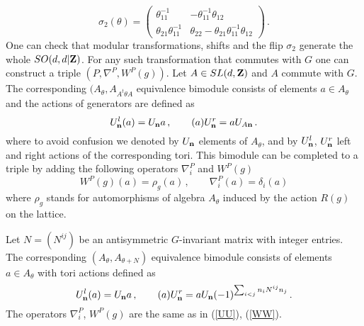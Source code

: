 \documentclass[a4paper,a4paper]{article}
\begin{document}
{\begin{equation}
\sigma_{2}(\theta ) =  \left( 
\begin{array}{cc}
\theta_{11}^{-1}&-\theta_{11}^{-1}\theta_{12}\\
\theta_{21}\theta_{11}^{-1}&\theta_{22} - \theta_{21}\theta_{11}^{-1}\theta_{12}
\end{array}
\right) \, .
\end{equation}
One can check that modular transformations, shifts and the flip $\sigma_{2}$ generate the whole $SO(d,d|{\bf Z})$.
For any such transformation that commutes with $G$ one can construct a triple $(P, \nabla^{P}, W^{P}(g))$. 
Let $A \in SL(d,{\bf Z})$ and $A$ commute with $G$. The corresponding $(A_{\theta}, A_{A^{t}\theta A}$ equivalence 
bimodule consists of elements $a\in A_{\theta}$ and the actions of generators  are 
defined as 
\begin{equation} \label{UU}
 U^{l}_{\bf n} (a) = U_{\bf n}a \, , \qquad (a)U_{\bf n}^{r} = aU_{A\bf n} \, .
\end{equation}
where to avoid confusion we denoted by $U_{\bf n}$ elements of $A_{\theta}$, and by $ U^{l}_{\bf n}$, $U_{\bf n}^{r}$ left 
and right actions of the corresponding tori. 
This bimodule can be completed to a triple by adding the following operators $\nabla_{i}^{P}$ and $W^{P}(g)$
\begin{equation} \label{WW}
W^{P}(g) (a) = \rho_g(a) \, , \qquad \nabla^{P}_{i}(a) = \delta_{i}(a)
\end{equation}
where $\rho_g$ stands for automorphisms of algebra $A_{\theta}$ induced by the action 
$R(g)$ on the lattice. 


Let $N =(N^{ij})$ be an antisymmetric $G$-invariant matrix with integer entries. The corresponding $(A_{\theta}, A_{\theta + N})$ 
equivalence bimodule consists of elements $a\in A_{\theta}$ with tori actions defined as 
\begin{equation}
U_{\bf n}^{l}(a) = U_{\bf n}a \, , \qquad (a)U^{r}_{\bf n}= aU_{\bf n}(-1)^{\sum_{i<j}n_{i}N^{ij}n_{j}} \, .
\end{equation}  
The operators  $\nabla_{i}^{P}$, $W^{P}(g)$ are the same as in (\ref{UU}), (\ref{WW}). 


}
\end{document}

